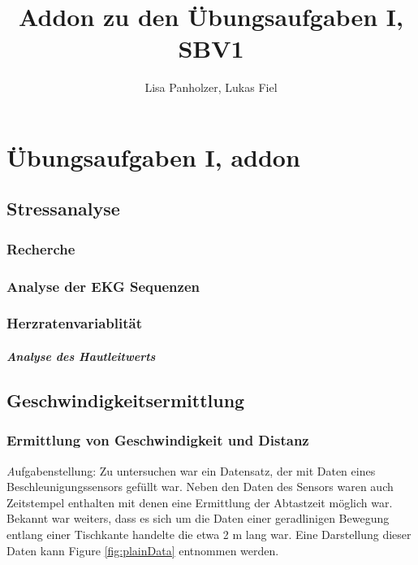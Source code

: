 \documentclass[12pt]{article}
\begin{document}
\title{Addon zu den Übungsaufgaben I, SBV1 }
\author{Lisa Panholzer, Lukas Fiel}
\maketitle


\newpage
\section{Übungsaufgaben I, addon}
\subsection{Stressanalyse}

\subsubsection{Recherche}

\subsubsection{Analyse der EKG Sequenzen}

\subsubsection{Herzratenvariablität}

\subparagraph{Analyse des Hautleitwerts}

\subsection{Geschwindigkeitsermittlung}
\label{sec:Geschwindigkeitsermittlung}
\subsubsection{Ermittlung von Geschwindigkeit und Distanz}
\textit Aufgabenstellung:
Zu untersuchen war ein Datensatz, der mit Daten eines Beschleunigungssensors gefüllt war. Neben den Daten des Sensors waren auch Zeitstempel enthalten mit denen eine Ermittlung der Abtastzeit möglich war. Bekannt war weiters, dass es sich um die Daten einer geradlinigen Bewegung entlang einer Tischkante handelte die etwa 2 m lang war. Eine Darstellung dieser Daten kann Figure \ref{fig:plainData} entnommen werden.
\end{document}
